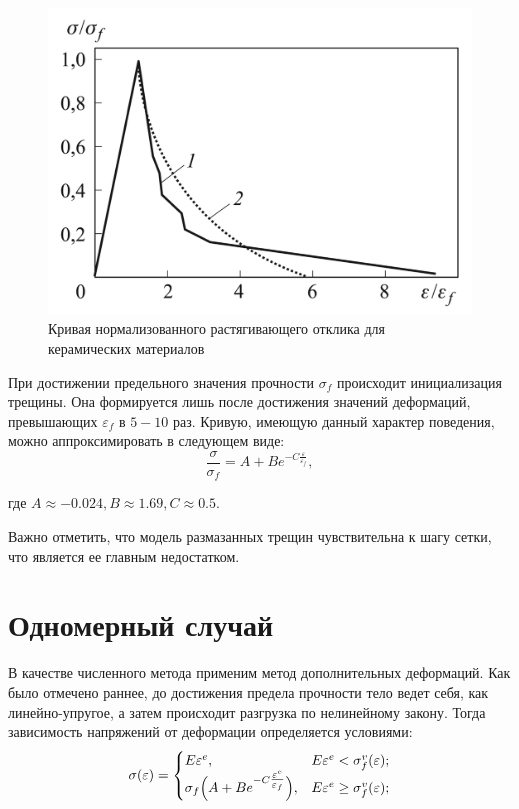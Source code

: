 \documentclass[12pt,a4paper]{article}
\begin{document}
  \begin{figure}[h]
    \centering
    \includegraphics[width=\textwidth]{ceramic.jpeg}
    \caption{Кривая нормализованного растягивающего отклика для керамических материалов}
    \label{fig:ceramic}
  \end{figure}

  \pagebreak

  При достижении предельного значения прочности $\sigma_f$ происходит инициализация трещины. Она формируется лишь после достижения значений деформаций, превышающих $\varepsilon_f$ в $5-10$ раз. Кривую, имеющую данный характер поведения, можно аппроксимировать в следующем виде:
  \[
    \dfrac{\sigma}{\sigma_f} = A + B e^{-C\tfrac{\varepsilon}{\varepsilon_f}},
  \]

  \noindent где $A \approx -0.024, B \approx 1.69, C \approx 0.5$.
  
  Важно отметить, что модель размазанных трещин чувствительна к шагу сетки, что является ее главным недостатком.

  \section{Одномерный случай}

  В качестве численного метода применим метод дополнительных деформаций. Как было отмечено раннее, до достижения предела прочности тело ведет себя, как линейно-упругое, а затем происходит разгрузка по нелинейному закону. Тогда зависимость напряжений от деформации определяется условиями:
  \[
    \sigma(\varepsilon) = 
    \begin{cases}
      E\varepsilon^e, & E\varepsilon^e < \sigma_f^v(\varepsilon); \\
      \sigma_f \Bigl( A + B e^{-C \tfrac{\varepsilon^e}{\varepsilon_f}} \Bigr), & E\varepsilon^e \geq \sigma_f^v(\varepsilon);
    \end{cases}
  \]
\end{document}
